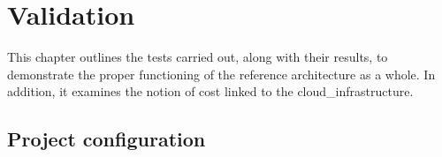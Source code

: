 

\chapter{Validation}
\label{chap:validation}

This chapter outlines the tests carried out, along with their results, to demonstrate the proper functioning of the reference architecture as a whole. In addition, it examines the notion of cost linked to the \gls{cloud_infrastructure}.

\minitoc
\newpage

\section{Project configuration}

